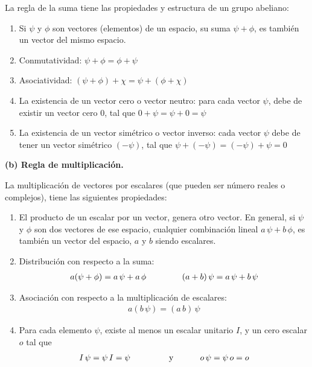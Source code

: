 La regla de la suma tiene las propiedades y estructura de un grupo abeliano:
\begin{enumerate}
\item Si $\psi$ y $\phi$ son vectores (elementos) de un espacio, su suma $\psi + \phi$, es también un vector del mismo espacio.
\item Conmutatividad: $\psi + \phi = \phi + \psi$
\item Asociatividad: $(\psi + \phi) + \chi = \psi + (\phi + \chi)$
\item La existencia de un vector cero o vector neutro: para cada vector $\psi$, debe de existir un vector cero $0$, tal que $0 + \psi = \psi + 0 = \psi$
\item La existencia de un vector simétrico o vector inverso: cada vector $\psi$ debe de tener un vector simétrico $(-\psi)$, tal que $\psi + (-\psi) = (-\psi) + \psi = 0$
\end{enumerate}
\textbf{(b) Regla de multiplicación.}

La multiplicación de vectores por escalares (que pueden ser número reales o complejos), tiene las siguientes propiedades:
\begin{enumerate}
\item El producto de un escalar por un vector, genera otro vector. En general, si $\psi$ y $\phi$ son dos vectores de ese espacio, cualquier combinación lineal $a \, \psi + b \, \phi$, es también un vector del espacio, $a$ y $b$ siendo escalares.
\item Distribución con respecto a la suma:
\begin{align}
a (\psi + \phi) = a \, \psi + a \, \phi \hspace{1.5cm} (a + b) \, \psi = a \, \psi + b \, \psi
\label{eq:ecuacion_02_01}
\end{align}
\item Asociación con respecto a la multiplicación de escalares:
\begin{align}
a (b \, \psi) = (a \, b) \, \psi
\label{eq:ecuacion_02_02}
\end{align}
\item Para cada elemento $\psi$, existe al menos un escalar unitario $I$, y un cero escalar $o$ tal que
\begin{align}
I \, \psi = \psi \, I = \psi \hspace{1.5cm} \mbox{ y } \hspace{1cm} o \, \psi = \psi \, o = o
\label{eq:ecuacion_02_03}
\end{align}
\end{enumerate}
